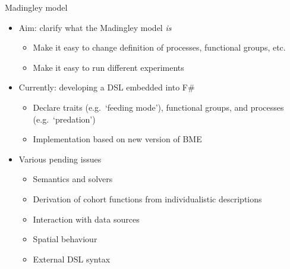 \documentclass[t,xcolor={usenames,dvipsnames}]{beamer}
\begin{document}
\begin{frame}{Madingley model}
\begin{itemize}
\item Aim: clarify what the Madingley model \emph{is}
  \begin{itemize}
  \item Make it easy to change definition of processes, functional groups, etc.
  \item Make it easy to run different experiments
  \end{itemize}
\item Currently: developing a DSL embedded into F\#
  \begin{itemize}
  \item Declare \alert{traits} (e.g.\ `feeding mode'), \alert{functional groups}, and \alert{processes} (e.g.\ `predation')
  \item Implementation based on new version of BME
  \end{itemize}
\item Various pending issues
  \begin{itemize}
  \item Semantics and solvers
  \item Derivation of cohort functions from individualistic descriptions
  \item Interaction with data sources
  \item Spatial behaviour
  \item External DSL syntax
  \end{itemize}
\end{itemize}
\end{frame}
\end{document}

